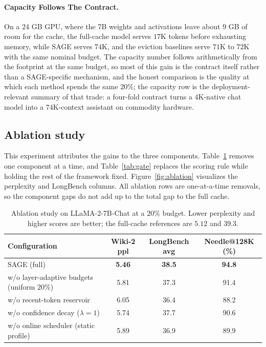 \paragraph{Capacity Follows The Contract.}
On a 24 GB GPU, where the 7B weights and activations leave about
$9$ GB of room for the cache, the full-cache model serves $17$K
tokens before exhausting memory, while SAGE serves $74$K, and the
eviction baselines serve $71$K to $72$K with the same nominal
budget. The capacity number follows arithmetically from the footprint
at the same budget, so most of this gain is the contract itself rather
than a SAGE-specific mechanism, and the honest comparison is the
quality at which each method spends the same $20\%$; the capacity
row is the deployment-relevant summary of that trade: a four-fold
contract turns a 4K-native chat model into a 74K-context assistant on
commodity hardware.

\subsection{Ablation study}\label{sec:exp_ablation}

This experiment attributes the gains to the three components.
Table~\ref{tab:ablation} removes one component at a time, and
Table~\ref{tab:gate} replaces the scoring rule while holding the rest
of the framework fixed. Figure~\ref{fig:ablation} visualizes the
perplexity and LongBench columns. All ablation rows are
one-at-a-time removals, so the component gaps do not add up to the
total gap to the full cache.

\begin{table}[t]
\centering
\caption{Ablation study on LLaMA-2-7B-Chat at a $20\%$ budget. Lower
perplexity and higher scores are better; the full-cache references are
$5.12$ and $39.3$.}
\label{tab:ablation}
\small
\begin{tabular*}{0.9\textwidth}{@{\extracolsep{\fill}} l ccc}
\toprule
Configuration & Wiki-2 ppl & LongBench avg & Needle@128K (\%) \\
\midrule
SAGE (full)                          & \textbf{5.46} & \textbf{38.5} & \textbf{94.8} \\
w/o layer-adaptive budgets (uniform $20\%$) & 5.81 & 37.3 & 91.4 \\
w/o recent-token reservoir           & 6.05 & 36.4 & 88.2 \\
w/o confidence decay ($\lambda{=}1$) & 5.74 & 37.7 & 90.6 \\
w/o online scheduler (static profile) & 5.89 & 36.9 & 89.9 \\
\bottomrule
\end{tabular*}
\end{table}

